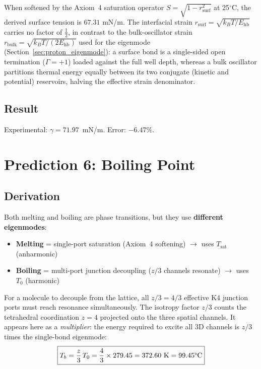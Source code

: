 When softened by the Axiom~4 saturation operator $S = \sqrt{1 - r_\mathrm{surf}^2}$ at 25$^\circ$C, the derived surface tension is $67.31$ mN/m. The interfacial strain $r_\mathrm{surf} = \sqrt{k_B T / E_\mathrm{hb}}$ carries no factor of $\tfrac{1}{2}$, in contrast to the bulk-oscillator strain $r_\mathrm{bulk} = \sqrt{k_B T / (2 E_\mathrm{hb})}$ used for the eigenmode (Section~\ref{sec:proton_eigenmode}): a surface bond is a single-sided open termination ($\Gamma = +1$\gammaundeclared{}) loaded against the full well depth, whereas a bulk oscillator partitions thermal energy equally between its two conjugate (kinetic and potential) reservoirs, halving the effective strain denominator.

\subsection{Result}
Experimental: $\gamma = 71.97$~mN/m. \quad Error: $\mathbf{-6.47\%}$.


\section{Prediction 6: Boiling Point}

\subsection{Derivation}

Both melting and boiling are phase transitions, but they use \textbf{different eigenmodes}:
\begin{itemize}
    \item \textbf{Melting} = single-port saturation (Axiom~4 softening) $\to$ uses $T_\mathrm{sat}$ (anharmonic)
    \item \textbf{Boiling} = multi-port junction decoupling ($z/3$ channels resonate) $\to$ uses $T_0$ (harmonic)
\end{itemize}

For a molecule to decouple from the lattice, all $z/3 = 4/3$ effective K4 junction ports must reach resonance simultaneously. The isotropy factor $z/3$ counts the tetrahedral coordination $z = 4$ projected onto the three spatial channels. It appears here as a \emph{multiplier}: the energy required to excite all 3D channels is $z/3$ times the single-bond eigenmode:
\begin{equation}
\boxed{
    T_b = \frac{z}{3}\, T_0 = \frac{4}{3} \times 279.45 = 372.60 \text{ K} = 99.45\text{\textdegree{}C}
}
\end{equation}

